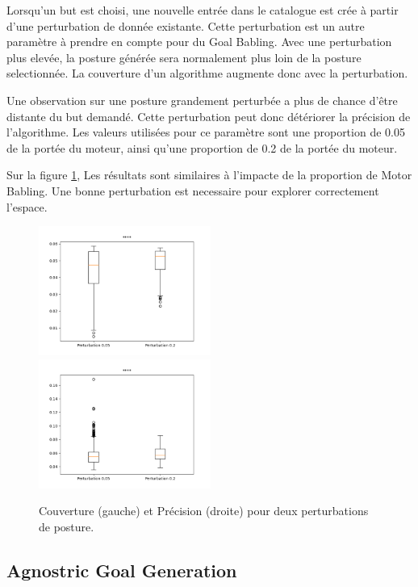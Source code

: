 \documentclass[11pt,french]{report}
\begin{document}
\phantom{INVISIBLE LINE}

Lorsqu'un but est choisi, une nouvelle entrée dans le catalogue est crée à partir d'une perturbation de donnée existante.
Cette perturbation est un autre paramètre à prendre en compte pour du Goal Babling.
Avec une perturbation plus elevée, la posture générée sera normalement plus loin de la posture selectionnée.
La couverture d'un algorithme augmente donc avec la perturbation.

Une observation sur une posture grandement perturbée a plus de chance d'être distante du but demandé.
Cette perturbation peut donc détériorer la précision de l'algorithme.
Les valeurs utilisées pour ce paramètre sont une proportion de 0.05 de la portée du moteur, ainsi qu'une proportion de 0.2 de la portée du moteur.

Sur la figure \ref{fig:effet_pp}, Les résultats sont similaires à l'impacte de la proportion de Motor Babling.
Une bonne perturbation est necessaire pour explorer correctement l'espace.

\begin{figure}[H]
    \centering
    \includegraphics[width=160pt]{0.05-.2pp_couver.png} \includegraphics[width=160pt]{0.05-.2pp_moy_gl.png}
    \caption{Couverture (gauche) et Précision (droite) pour deux perturbations de posture.}
    \label{fig:effet_pp}
\end{figure}

\pagebreak

\subsection{Agnostric Goal Generation}
\end{document}
